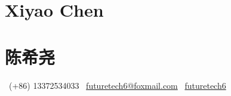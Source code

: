 \ifdefined\english

    \part*{Xiyao Chen}



\else

    \part*{陈希尧}



\fi

~(+86) 13372534033
\quad \textbar{} \quad
{}~\href{mailto:futuretech6@foxmail.com}{futuretech6@foxmail.com}
\quad \textbar{} \quad
{}~\href{https://github.com/futuretech6}{futuretech6}




% 






